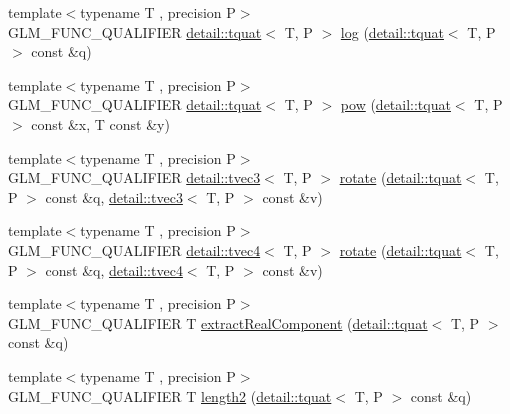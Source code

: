 \begin{DoxyCompactItemize}
\item 
{\footnotesize template$<$typename T , precision P$>$ }\\G\+L\+M\+\_\+\+F\+U\+N\+C\+\_\+\+Q\+U\+A\+L\+I\+F\+I\+ER \hyperlink{structglm_1_1detail_1_1tquat}{detail\+::tquat}$<$ T, P $>$ \hyperlink{group__gtx__quaternion_ga832e6b69f9e5f596cad8bada9ebb4477}{log} (\hyperlink{structglm_1_1detail_1_1tquat}{detail\+::tquat}$<$ T, P $>$ const \&q)
\item 
{\footnotesize template$<$typename T , precision P$>$ }\\G\+L\+M\+\_\+\+F\+U\+N\+C\+\_\+\+Q\+U\+A\+L\+I\+F\+I\+ER \hyperlink{structglm_1_1detail_1_1tquat}{detail\+::tquat}$<$ T, P $>$ \hyperlink{group__gtx__quaternion_ga9c9854d641f71f853cfed9dc5d4ef762}{pow} (\hyperlink{structglm_1_1detail_1_1tquat}{detail\+::tquat}$<$ T, P $>$ const \&x, T const \&y)
\item 
{\footnotesize template$<$typename T , precision P$>$ }\\G\+L\+M\+\_\+\+F\+U\+N\+C\+\_\+\+Q\+U\+A\+L\+I\+F\+I\+ER \hyperlink{structglm_1_1detail_1_1tvec3}{detail\+::tvec3}$<$ T, P $>$ \hyperlink{group__gtx__quaternion_gaa4ac5806c1c001ac0247b1e1fd07dddf}{rotate} (\hyperlink{structglm_1_1detail_1_1tquat}{detail\+::tquat}$<$ T, P $>$ const \&q, \hyperlink{structglm_1_1detail_1_1tvec3}{detail\+::tvec3}$<$ T, P $>$ const \&v)
\item 
{\footnotesize template$<$typename T , precision P$>$ }\\G\+L\+M\+\_\+\+F\+U\+N\+C\+\_\+\+Q\+U\+A\+L\+I\+F\+I\+ER \hyperlink{structglm_1_1detail_1_1tvec4}{detail\+::tvec4}$<$ T, P $>$ \hyperlink{group__gtx__quaternion_ga3461e43b8c7da533b10bc5e9961add80}{rotate} (\hyperlink{structglm_1_1detail_1_1tquat}{detail\+::tquat}$<$ T, P $>$ const \&q, \hyperlink{structglm_1_1detail_1_1tvec4}{detail\+::tvec4}$<$ T, P $>$ const \&v)
\item 
{\footnotesize template$<$typename T , precision P$>$ }\\G\+L\+M\+\_\+\+F\+U\+N\+C\+\_\+\+Q\+U\+A\+L\+I\+F\+I\+ER T \hyperlink{group__gtx__quaternion_gaad86e595f0021253cb9d34ca32f27f3c}{extract\+Real\+Component} (\hyperlink{structglm_1_1detail_1_1tquat}{detail\+::tquat}$<$ T, P $>$ const \&q)
\item 
{\footnotesize template$<$typename T , precision P$>$ }\\G\+L\+M\+\_\+\+F\+U\+N\+C\+\_\+\+Q\+U\+A\+L\+I\+F\+I\+ER T \hyperlink{group__gtx__quaternion_gaac8d704c7dfac92835109953b88f1c92}{length2} (\hyperlink{structglm_1_1detail_1_1tquat}{detail\+::tquat}$<$ T, P $>$ const \&q)

\end{DoxyCompactItemize}
